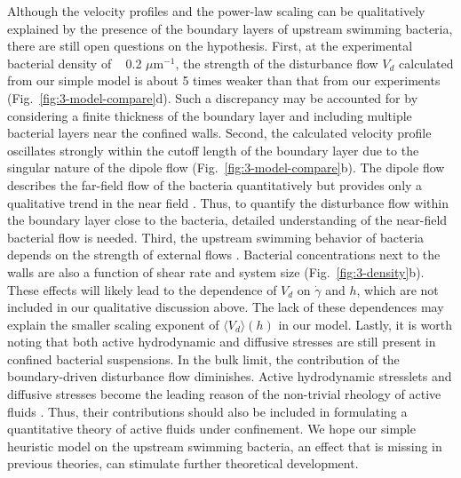 Although the velocity profiles and the power-law scaling can be qualitatively explained by the presence of the boundary layers of upstream swimming bacteria, there are still open questions on the hypothesis. First, at the experimental bacterial density of ~ 0.2 $\mu$m$^{-1}$, the strength of the disturbance flow $V_d$ calculated from our simple model is about 5 times weaker than that from our experiments (Fig.~\ref{fig:3-model-compare}d). Such a discrepancy may be accounted for by considering a finite thickness of the boundary layer and including multiple bacterial layers near the confined walls. Second, the calculated velocity profile oscillates strongly within the cutoff length of the boundary layer due to the singular nature of the dipole flow (Fig.~\ref{fig:3-model-compare}b). The dipole flow describes the far-field flow of the bacteria quantitatively but provides only a qualitative trend in the near field \cite{Drescher2011, Mathijssen2016}. Thus, to quantify the disturbance flow within the boundary layer close to the bacteria, detailed  understanding of the near-field bacterial flow is needed. Third, the upstream swimming behavior of bacteria depends on the strength of external flows \cite{Kaya2012}.
Bacterial concentrations next to the walls are also a function of shear rate and system size (Fig.~\ref{fig:3-density}b). These effects will likely lead to the dependence of $V_d$ on $\dot\gamma$ and $h$, which are not included in our qualitative discussion above. The lack of these dependences may explain the smaller scaling exponent of $\langle V_d \rangle(h)$ in our model. Lastly, it is worth noting that both active hydrodynamic and diffusive stresses are still present in confined bacterial suspensions. In the bulk limit, the contribution of the boundary-driven disturbance flow diminishes. Active hydrodynamic stresslets and diffusive stresses
become the leading reason of the non-trivial rheology of active fluids \cite{Alonso-Matilla2016, Takatori2017}. Thus, their contributions should also be included in formulating a quantitative theory of active fluids under confinement. We hope our simple heuristic model on the upstream swimming bacteria, an effect that is missing in previous theories, can stimulate further theoretical development.

